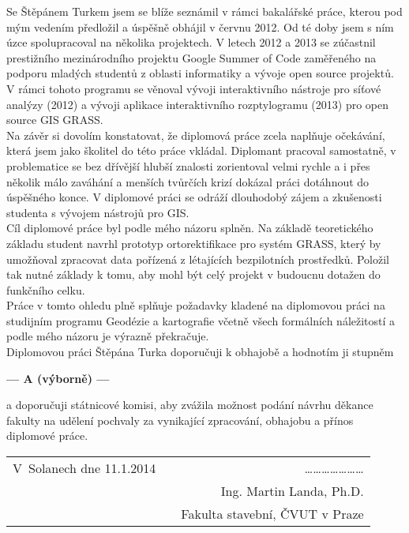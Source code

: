 \documentclass[czech,11pt,a4paper]{article}
\begin{document}
Se Štěpánem Turkem jsem se blíže seznámil v rámci bakalářské práce,
kterou pod mým vedením předložil a úspěšně obhájil v červnu 2012. Od
té doby jsem s ním úzce spolupracoval na několika projektech. V letech
2012 a 2013 se zúčastnil prestižního mezinárodního projektu Google
Summer of Code zaměřeného na podporu mladých studentů z oblasti
informatiky a vývoje open source projektů. V rámci tohoto programu se
věnoval vývoji interaktivního nástroje pro síťové analýzy (2012) a
vývoji aplikace interaktivního rozptylogramu (2013) pro open source
GIS GRASS.
\\

Na závěr si dovolím konstatovat, že diplomová práce zcela naplňuje
očekávání, která jsem jako školitel do této práce vkládal. Diplomant
pracoval samostatně, v problematice se bez dřívější hlubší znalosti
zorientoval velmi rychle a i přes několik málo zaváhání a menších
tvůrčích krizí dokázal práci dotáhnout do úspěšného konce. V diplomové
práci se odráží dlouhodobý zájem a zkušenosti studenta s vývojem
nástrojů pro GIS.
\\

Cíl diplomové práce byl podle mého názoru splněn. Na základě
teoretického základu student navrhl prototyp ortorektifikace pro
systém GRASS, který by umožňoval zpracovat data pořízená z létajících
bezpilotních prostředků. Položil tak nutné základy k tomu, aby mohl
být celý projekt v budoucnu dotažen do funkčního celku.
\\

Práce v tomto ohledu plně splňuje požadavky kladené na diplomovou
práci na studijním programu Geodézie a kartografie včetně všech
formálních náležitostí a podle mého názoru je výrazně překračuje.
\\

Diplomovou práci Štěpána Turka doporučuji k obhajobě a hodnotím ji
stupněm

\begin{center}
{\bf --- A (výborně)  ---}
\end{center}

a doporučuji státnicové komisi, aby zvážila možnost podání návrhu
děkance fakulty na udělení pochvaly za vynikající zpracování, obhajobu
a přínos diplomové práce.

\vspace{2cm}

\noindent \begin{tabular}{lp{}r}
V~Solanech dne 11.1.2014 & & \ldots\ldots\ldots\ldots\ldots\ldots\ldots \\
& & Ing. Martin Landa, Ph.D. \\
& & Fakulta stavební, ČVUT v Praze \\
\end{tabular}
\end{document}
